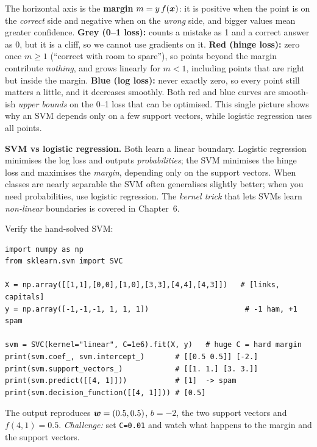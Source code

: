 \begin{explain}
The horizontal axis is the \textbf{margin} $m=y\,f(\boldsymbol{x})$: it is positive when the point is on the \emph{correct} side and negative when on the \emph{wrong} side, and bigger values mean greater confidence. \textbf{Grey (0--1 loss):} counts a mistake as 1 and a correct answer as 0, but it is a cliff, so we cannot use gradients on it. \textbf{Red (hinge loss):} zero once $m\ge1$ (``correct with room to spare''), so points beyond the margin contribute \emph{nothing}, and grows linearly for $m<1$, including points that are right but inside the margin. \textbf{Blue (log loss):} never exactly zero, so every point still matters a little, and it decreases smoothly. Both red and blue curves are smooth-ish \emph{upper bounds} on the 0--1 loss that can be optimised. This single picture shows why an SVM depends only on a few support vectors, while logistic regression uses all points.
\end{explain}

\begin{keyidea}
\textbf{SVM vs logistic regression.} Both learn a linear boundary. Logistic regression minimises the log loss and outputs \emph{probabilities}; the SVM minimises the hinge loss and maximises the \emph{margin}, depending only on the support vectors. When classes are nearly separable the SVM often generalises slightly better; when you need probabilities, use logistic regression. The \emph{kernel trick} that lets SVMs learn \emph{non-linear} boundaries is covered in Chapter~6.
\end{keyidea}

\begin{tryit}
Verify the hand-solved SVM:
\begin{lstlisting}
import numpy as np
from sklearn.svm import SVC

X = np.array([[1,1],[0,0],[1,0],[3,3],[4,4],[4,3]])   # [links, capitals]
y = np.array([-1,-1,-1, 1, 1, 1])                      # -1 ham, +1 spam

svm = SVC(kernel="linear", C=1e6).fit(X, y)   # huge C = hard margin
print(svm.coef_, svm.intercept_)       # [[0.5 0.5]] [-2.]
print(svm.support_vectors_)            # [[1. 1.] [3. 3.]]
print(svm.predict([[4, 1]]))           # [1]  -> spam
print(svm.decision_function([[4, 1]])) # [0.5]
\end{lstlisting}
The output reproduces $\boldsymbol{w}=(0.5,0.5)$, $b=-2$, the two support vectors and $f(4,1)=0.5$. \emph{Challenge:} set \texttt{C=0.01} and watch what happens to the margin and the support vectors.
\end{tryit}

